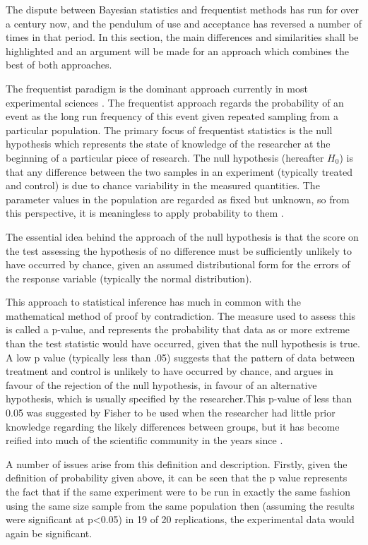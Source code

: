 The dispute between Bayesian statistics and frequentist methods has run for over a century now, and the pendulum of use and acceptance has reversed a number of times in that period. In this section, the main differences and similarities shall be highlighted and an argument will be made for an approach which combines the best of both approaches. 

The frequentist paradigm is the dominant approach currently in most experimental sciences \cite{gill2002bayesian,gelman2004bayesian} . The frequentist approach regards the probability of an event as the long run frequency of this event given repeated sampling from a particular population. The primary focus of frequentist statistics is the null hypothesis which represents the state of knowledge of the researcher at the beginning of a particular piece of research. The null hypothesis (hereafter $H_0$) is that any difference between the two samples in an experiment (typically treated and control) is due to chance variability in the measured quantities. The parameter values in the population are regarded as fixed but unknown, so from this perspective, it is meaningless to apply probability to them \cite{gill2002bayesian,gelman2004bayesian}.  

The essential idea behind the approach of the null hypothesis is that the score on the test assessing the hypothesis of no difference must be sufficiently unlikely to have occurred by chance, given an assumed distributional form for the errors of the response variable (typically  the normal distribution). 

This approach to statistical inference has much in common with the mathematical method of proof by contradiction. The measure used to assess this is called a p-value, and represents the probability that data as or more extreme than the test statistic would have occurred, given that the null hypothesis is true. A low p value (typically less than .05) suggests that the pattern of data between treatment and control is unlikely to have occurred by chance, and argues in favour of the rejection of the null hypothesis, in favour of an alternative hypothesis, which is usually specified by the researcher.This p-value of less than 0.05 was suggested by Fisher to be used when the researcher had little prior knowledge regarding the likely differences between groups, but it has become reified into much of the scientific community in the years since \cite{gigerenzer2004mindless}.  

A number of issues arise from this definition and description. Firstly, given the definition of probability given above, it can be seen that the p value represents the fact that if the same experiment were to be run in exactly the same fashion using the same size sample from the same population then (assuming the results were significant at p<0.05) in 19 of 20 replications, the experimental data would again be significant. 

